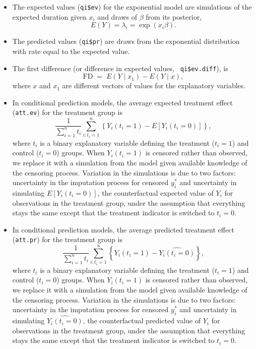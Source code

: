 \begin{itemize}
\item The expected values ({\tt qi\$ev}) for the exponential model are
  simulations of the expected duration given $x_i$ and draws of
  $\beta$ from its posterior, $$E(Y) = \lambda_i = \exp(x_i \beta).$$

\item The predicted values ({\tt qi\$pr}) are draws from the
  exponential distribution with rate equal to the expected value.  

\item The first difference (or difference in expected values, {\tt
  qi\$ev.diff}), is
\begin{equation}
\textrm{FD} \; = \; E(Y \mid x_1) - E(Y \mid x), 
\end{equation}
where $x$ and $x_1$ are different vectors of values for the
explanatory variables.  

\item In conditional prediction models, the average expected treatment
  effect ({\tt att.ev}) for the treatment group is \begin{equation*}
  \frac{1}{\sum_{i=1}^n t_i}\sum_{i:t_i=1}^n \left\{ Y_i(t_i=1) - E[Y_i(t_i=0)]
  \right\}, \end{equation*} where $t_i$ is a binary explanatory
  variable defining the treatment ($t_i=1$) and control ($t_i=0$)
  groups. When $Y_i(t_i=1)$ is censored rather than observed, we
  replace it with a simulation from the model given available
  knowledge of the censoring process.  Variation in the simulations
  is due to two factors: uncertainty in the imputation process for
  censored $y_i^*$ and uncertainty in simulating $E[Y_i(t_i=0)]$, the
  counterfactual expected value of $Y_i$ for observations in the
  treatment group, under the assumption that everything stays the same
  except that the treatment indicator is switched to $t_i=0$.
    
  \item In conditional prediction models, the average predicted
  treatment effect ({\tt att.pr}) for the treatment group is
  \begin{equation*} \frac{1}{\sum_{i=1}^n t_i}\sum_{i:t_i=1}^n \left\{ Y_i(t_i=1) -
  \widehat{Y_i(t_i=0)} \right\}, \end{equation*} where $t_i$ is a
  binary explanatory variable defining the treatment ($t_i=1$) and
  control ($t_i=0$) groups.  When $Y_i(t_i=1)$ is censored rather than
  observed, we replace it with a simulation from the model given
  available knowledge of the censoring process.  Variation in the
  simulations is due to two factors: uncertainty in the imputation
  process for censored $y_i^*$ and uncertainty in simulating
  $\widehat{Y_i(t_i=0)}$, the counterfactual predicted value of $Y_i$
  for observations in the treatment group, under the assumption that
  everything stays the same except that the treatment indicator is
  switched to $t_i=0$.

\end{itemize}

